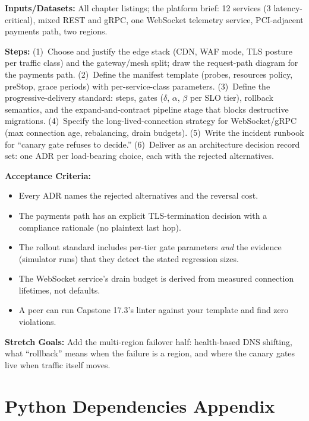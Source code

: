 \textbf{Inputs/Datasets:} All chapter listings; the platform brief: 12
services (3 latency-critical), mixed REST and gRPC, one WebSocket
telemetry service, PCI-adjacent payments path, two regions.

\textbf{Steps:} (1)~Choose and justify the edge stack (CDN, WAF mode,
TLS posture per traffic class) and the gateway/mesh split; draw the
request-path diagram for the payments path. (2)~Define the manifest
template (probes, resources policy, preStop, grace periods) with
per-service-class parameters. (3)~Define the progressive-delivery
standard: steps, gates ($\delta$, $\alpha$, $\beta$ per SLO tier),
rollback semantics, and the expand-and-contract pipeline stage that
blocks destructive migrations. (4)~Specify the long-lived-connection
strategy for WebSocket/gRPC (max connection age, rebalancing, drain
budgets). (5)~Write the incident runbook for ``canary gate refuses to
decide.'' (6)~Deliver as an architecture decision record set: one ADR
per load-bearing choice, each with the rejected alternatives.

\textbf{Acceptance Criteria:}
\begin{itemize}
  \item[$\square$] Every ADR names the rejected alternatives and the
        reversal cost.
  \item[$\square$] The payments path has an explicit TLS-termination
        decision with a compliance rationale (no plaintext last hop).
  \item[$\square$] The rollout standard includes per-tier gate
        parameters \emph{and} the evidence (simulator runs) that they
        detect the stated regression sizes.
  \item[$\square$] The WebSocket service's drain budget is derived from
        measured connection lifetimes, not defaults.
  \item[$\square$] A peer can run Capstone 17.3's linter against your
        template and find zero violations.
\end{itemize}

\textbf{Stretch Goals:} Add the multi-region failover half: health-based
DNS shifting, what ``rollback'' means when the failure is a region, and
where the canary gates live when traffic itself moves.

\section{Python Dependencies Appendix}
\label{sec:ch17-deps}

